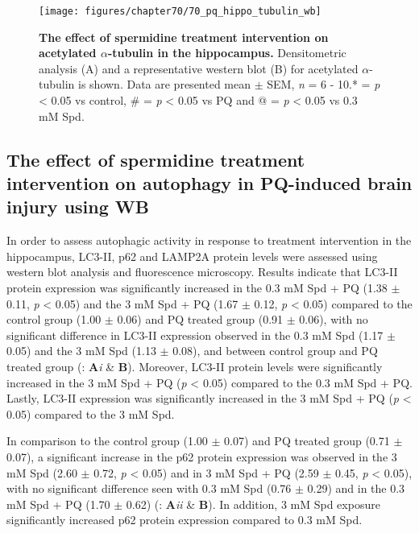 \begin{figure}[!htbp]
\center
  \texttt{[image: figures/chapter70/70\_pq\_hippo\_tubulin\_wb]}
  \caption[The effect of spermidine treatment intervention on acetylated $\alpha$-tubulin expression in the hippocampus]{\textbf{The effect of spermidine treatment intervention on acetylated $\alpha$-tubulin in the hippocampus.} Densitometric analysis (A) and a representative western blot (B) for acetylated $\alpha$-tubulin is shown. Data are presented  mean $\pm$ SEM, \textit{n} = 6 - 10.* = \textit{p} < 0.05 vs control, \# = \textit{p} < 0.05 vs PQ and @ = \textit{p} < 0.05 vs 0.3 mM Spd.}
  \label{fig:70_pq_hippo_tubulin_wb}
\end{figure} 

\subsection{The effect of spermidine treatment intervention on autophagy in PQ-induced brain injury using WB}
In order to assess autophagic activity in response to treatment intervention in the hippocampus, LC3-II, p62 and LAMP2A protein levels were assessed using western blot analysis and fluorescence microscopy. Results indicate that LC3-II protein expression was significantly increased in the 0.3 mM Spd + PQ (1.38 $\pm$ 0.11, \textit{p} < 0.05) and the 3 mM Spd + PQ (1.67 $\pm$ 0.12, \textit{p} < 0.05) compared to the control group (1.00 $\pm$ 0.06) and PQ treated group (0.91 $\pm$ 0.06), with no significant difference in LC3-II expression observed in the 0.3 mM Spd (1.17 $\pm$ 0.05) and the 3 mM Spd (1.13 $\pm$ 0.08), and between control group and PQ treated group (: \textbf{A}\textit{i} \& \textbf{B}). Moreover, LC3-II protein levels were significantly increased in the 3 mM Spd + PQ (\textit{p} < 0.05) compared to the 0.3 mM Spd + PQ. Lastly, LC3-II expression was significantly increased in the 3 mM Spd + PQ (\textit{p} < 0.05) compared to the 3 mM Spd.

In comparison to the control group (1.00 $\pm$ 0.07) and PQ treated group (0.71 $\pm$ 0.07), a significant increase in the p62 protein expression was observed in the 3 mM Spd (2.60 $\pm$ 0.72, \textit{p} < 0.05) and in 3 mM Spd + PQ (2.59 $\pm$ 0.45, \textit{p} < 0.05), with no significant difference seen with 0.3 mM Spd (0.76 $\pm$ 0.29) and in the 0.3 mM Spd + PQ (1.70 $\pm$ 0.62) (: \textbf{A}\textit{ii} \& \textbf{B}). In addition, 3 mM Spd exposure significantly increased p62 protein expression compared to 0.3 mM Spd.

